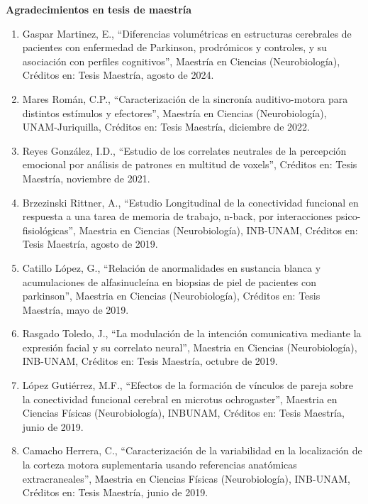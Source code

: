 \textbf{Agradecimientos en tesis de maestría}

\hfill

\begin{enumerate}

\item Gaspar Martinez, E., “Diferencias volumétricas en estructuras cerebrales de pacientes con enfermedad de Parkinson, 
prodrómicos y controles, y su asociación con perfiles cognitivos”, Maestría en Ciencias (Neurobiología), Créditos en: Tesis 
Maestría, agosto de 2024.

\item Mares Román, C.P., “Caracterización de la sincronía auditivo-motora para distintos estímulos y efectores”, Maestría 
en 
Ciencias (Neurobiología), UNAM-Juriquilla, Créditos en: Tesis Maestría, diciembre de 2022.

\item Reyes González, I.D., “Estudio de los correlates neutrales de la percepción emocional por análisis de patrones en 
multitud de voxels”, Créditos en: Tesis Maestría, noviembre de 2021.

\item Brzezinski Rittner, A., “Estudio Longitudinal de la conectividad funcional en respuesta a una tarea de memoria de 
trabajo, n-back, por interacciones psico-fisiológicas”, Maestria en Ciencias (Neurobiología), INB-UNAM, Créditos en: Tesis 
Maestría, agosto de 2019.

\item Catillo López, G., “Relación de anormalidades en sustancia blanca y acumulaciones de alfasinucleína en biopsias de 
piel 
de pacientes con parkinson”, Maestria en Ciencias (Neurobiología), Créditos en: Tesis Maestría, mayo de 2019.

\item Rasgado Toledo, J., “La modulación de la intención comunicativa mediante la expresión facial y su correlato neural”, 
Maestria en Ciencias (Neurobiología), INB-UNAM, Créditos en: Tesis Maestría, octubre de 2019.

\item López Gutiérrez, M.F., “Efectos de la formación de vínculos de pareja sobre la conectividad funcional cerebral en 
microtus ochrogaster”, Maestria en Ciencias Físicas (Neurobiología), INBUNAM, Créditos en: Tesis Maestría, junio de 2019.

\item Camacho Herrera, C., “Caracterización de la variabilidad en la localización de la corteza motora suplementaria usando 
referencias anatómicas extracraneales”, Maestria en Ciencias Físicas (Neurobiología), INB-UNAM, Créditos en: Tesis 
Maestría, junio de 2019.


\end{enumerate}
